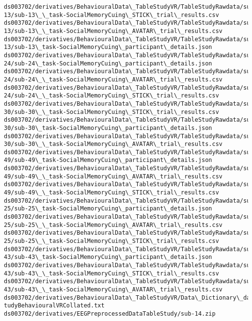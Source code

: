 \documentclass[11pt]{article}
\begin{document}
\begin{Verbatim}[commandchars=\\\{\}]
ds003702/derivatives/BehaviouralData\_TableStudyVR/TableStudyRawdata/sub-
13/sub-13\_\_task-SocialMemoryCuing\_STICK\_trial\_results.csv
ds003702/derivatives/BehaviouralData\_TableStudyVR/TableStudyRawdata/sub-
13/sub-13\_\_task-SocialMemoryCuing\_AVATAR\_trial\_results.csv
ds003702/derivatives/BehaviouralData\_TableStudyVR/TableStudyRawdata/sub-
13/sub-13\_task-SocialMemoryCuing\_participant\_details.json
ds003702/derivatives/BehaviouralData\_TableStudyVR/TableStudyRawdata/sub-
24/sub-24\_task-SocialMemoryCuing\_participant\_details.json
ds003702/derivatives/BehaviouralData\_TableStudyVR/TableStudyRawdata/sub-
24/sub-24\_\_task-SocialMemoryCuing\_AVATAR\_trial\_results.csv
ds003702/derivatives/BehaviouralData\_TableStudyVR/TableStudyRawdata/sub-
24/sub-24\_\_task-SocialMemoryCuing\_STICK\_trial\_results.csv
ds003702/derivatives/BehaviouralData\_TableStudyVR/TableStudyRawdata/sub-
30/sub-30\_\_task-SocialMemoryCuing\_STICK\_trial\_results.csv
ds003702/derivatives/BehaviouralData\_TableStudyVR/TableStudyRawdata/sub-
30/sub-30\_task-SocialMemoryCuing\_participant\_details.json
ds003702/derivatives/BehaviouralData\_TableStudyVR/TableStudyRawdata/sub-
30/sub-30\_\_task-SocialMemoryCuing\_AVATAR\_trial\_results.csv
ds003702/derivatives/BehaviouralData\_TableStudyVR/TableStudyRawdata/sub-
49/sub-49\_task-SocialMemoryCuing\_participant\_details.json
ds003702/derivatives/BehaviouralData\_TableStudyVR/TableStudyRawdata/sub-
49/sub-49\_\_task-SocialMemoryCuing\_AVATAR\_trial\_results.csv
ds003702/derivatives/BehaviouralData\_TableStudyVR/TableStudyRawdata/sub-
49/sub-49\_\_task-SocialMemoryCuing\_STICK\_trial\_results.csv
ds003702/derivatives/BehaviouralData\_TableStudyVR/TableStudyRawdata/sub-
25/sub-25\_task-SocialMemoryCuing\_participant\_details.json
ds003702/derivatives/BehaviouralData\_TableStudyVR/TableStudyRawdata/sub-
25/sub-25\_\_task-SocialMemoryCuing\_AVATAR\_trial\_results.csv
ds003702/derivatives/BehaviouralData\_TableStudyVR/TableStudyRawdata/sub-
25/sub-25\_\_task-SocialMemoryCuing\_STICK\_trial\_results.csv
ds003702/derivatives/BehaviouralData\_TableStudyVR/TableStudyRawdata/sub-
43/sub-43\_task-SocialMemoryCuing\_participant\_details.json
ds003702/derivatives/BehaviouralData\_TableStudyVR/TableStudyRawdata/sub-
43/sub-43\_\_task-SocialMemoryCuing\_STICK\_trial\_results.csv
ds003702/derivatives/BehaviouralData\_TableStudyVR/TableStudyRawdata/sub-
43/sub-43\_\_task-SocialMemoryCuing\_AVATAR\_trial\_results.csv
ds003702/derivatives/BehaviouralData\_TableStudyVR/Data\_Dictionary\_dataTables
tudyBehaviouralVRCollated.txt
ds003702/derivatives/EEGPreprocessedDataTableStudy/sub-14.zip

\end{Verbatim}
\end{document}
